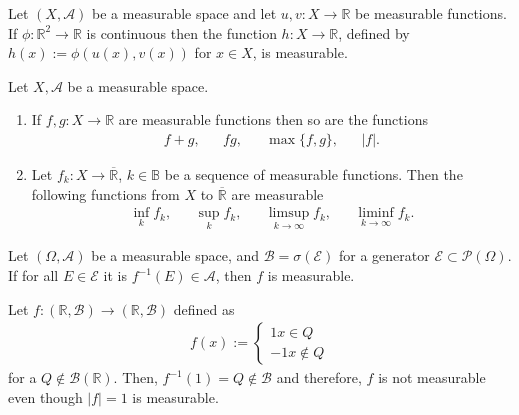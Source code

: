 %
\begin{lemma}
    Let \((X, \mathcal{A})\) be a measurable space and let \(u, v: X \rightarrow \mathbb{R}\) be measurable functions. If \(\phi: \mathbb{R}^2 \rightarrow \mathbb{R}\) is continuous then the function \(h: X \rightarrow \mathbb{R}\), defined by \(h(x) := \phi(u(x), v(x))\) for \(x \in X\), is measurable.
\end{lemma}
%
\begin{theorem}
    Let \(X, \mathcal{A}\) be a measurable space.
    \begin{enumerate}
        \item If \(f, g: X \rightarrow \mathbb{R}\) are measurable functions then so are the functions
        \begin{align}
            f+g, && fg, && \max\{f, g\}, && |f| \text{.}
        \end{align}
        \item Let \(f_k: X \rightarrow \overline{\mathbb{R}}\), \(k \in \mathbb{B}\) be a sequence of measurable functions. Then the following functions from \(X\) to \(\overline{\mathbb{R}}\) are measurable
        \begin{align}
            \inf_k f_k, && \sup_k f_k, && \limsup_{k \rightarrow \infty} f_k, && \liminf_{k \rightarrow \infty} f_k \text{.}
        \end{align}
    \end{enumerate}
\end{theorem}
%
\begin{theorem}
    Let \((\Omega, \mathcal{A})\) be a measurable space, and \(\mathcal{B} = \sigma(\mathcal{E})\) for a generator \(\mathcal{E} \subset \mathcal{P}(\Omega)\). If for all \(E \in \mathcal{E}\) it is \(f^{-1}(E) \in \mathcal{A}\), then \(f\) is measurable.
\end{theorem}
\begin{example}
    Let \(f:(\mathbb{R}, \mathcal{B}) \rightarrow (\mathbb{R}, \mathcal{B})\) defined as
    \begin{align}
        f(x) := \begin{cases}
            1 x \in Q \\
            -1 x \notin Q
        \end{cases}
    \end{align}
    for a \(Q \notin \mathcal{B}(\mathbb{R})\). Then, \(f^{-1}({1})=Q \notin \mathcal{B}\) and therefore, \(f\) is not measurable even though \(|f| = 1\) is measurable.
\end{example}
